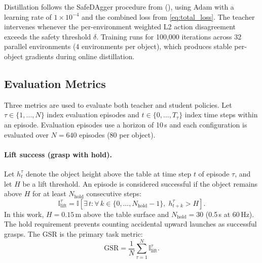 Distillation follows the SafeDAgger procedure from  (), using Adam with a learning rate of $1 \times 10^{-4}$ and the combined loss from \cref{eq:total_loss}.
The teacher intervenes whenever the per-environment weighted L2 action disagreement exceeds the safety threshold $\delta$.
Training runs for 100{,}000 iterations across 32 parallel environments (4 environments per object), which produces stable per-object gradients during online distillation.

\subsection{Evaluation Metrics}%
\label{sec:eval_protocol}%

Three metrics are used to evaluate both teacher and student policies.
Let $\tau \in \{1, \ldots, N\}$ index evaluation episodes and $t \in \{0, \ldots, T_\tau\}$ index time steps within an episode.
Evaluation episodes use a horizon of 10\,s and each configuration is evaluated over $N = 640$ episodes (80 per object).

\paragraph{Lift success (grasp with hold).}
Let $h_t^\tau$ denote the object height above the table at time step $t$ of episode $\tau$, and let $H$ be a lift threshold.
An episode is considered successful if the object remains above $H$ for at least $N_{\text{hold}}$ consecutive steps:
%
\begin{equation}\label{eq:lift_success}
    \mathbb{I}^{\tau}_{\text{lift}} = \mathbb{I}\!\left[\exists\, t : \forall\, k \in \{0, \ldots, N_{\text{hold}}-1\},\; h_{t+k}^{\tau} > H\right].
\end{equation}
%
In this work, $H = 0.15\,\mathrm{m}$ above the table surface and $N_{\text{hold}} = 30$ (0.5\,s at 60\,Hz).
The hold requirement prevents counting accidental upward launches as successful grasps.
The \ac{GSR} is the primary task metric:
%
\begin{equation}\label{eq:gsr}
    \text{GSR} = \frac{1}{N} \sum_{\tau=1}^{N} \mathbb{I}^{\tau}_{\text{lift}}.
\end{equation}

